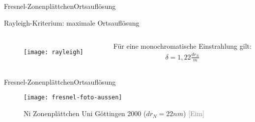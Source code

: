 \begin{frame}{Fresnel-Zonenplättchen}{Ortsauflösung}
	\begin{block}{Rayleigh-Kriterium: maximale Ortsauflösung}
    	
    	\begin{columns}
		    	\begin{figure}[H]
						\texttt{[image: rayleigh]}
				\end{figure}
		    	Für eine monochromatische Einstrahlung gilt: 
				\begin{align*}
					\delta = 1,22 \frac{dr_N}{m}
				\end{align*}

		\end{columns}
	\end{block}
\end{frame}

\begin{frame}{Fresnel-Zonenplättchen}{Ortsauflösung}
	\begin{figure}[H]
		\begin{center}
			\texttt{[image: fresnel-foto-aussen]}
			\caption{Ni Zonenplättchen Uni Göttingen 2000 ($dr_N=22nm$)  \tiny{\textcolor{gray}{[Eim]}}}
		\end{center}
	\end{figure}
\end{frame}

